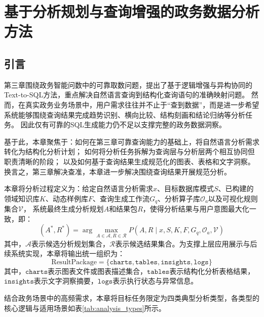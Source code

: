 \chapter{基于分析规划与查询增强的政务数据分析方法}\label{chap:analysis_method}

\section{引言}

第三章围绕政务智能问数中的可靠取数问题，提出了基于逻辑增强与异构协同的Text-to-SQL方法，重点解决自然语言查询到结构化查询语句的准确映射问题。
然而，在真实政务业务场景中，用户需求往往并不止于“查到数据”，而是进一步希望系统能够围绕查询结果完成趋势识别、横向比较、结构刻画和结论归纳等分析任务。
因此仅有可靠的SQL生成能力仍不足以支撑完整的政务数据洞察。

基于此，本章聚焦于：如何在第三章可靠查询能力的基础上，将自然语言分析需求转化为结构化分析计划；
如何将分析任务拆解为查询层与分析层两个相互协同但职责清晰的阶段；
以及如何基于查询结果生成规范化的图表、表格和文字洞察。换言之，第三章解决查准，本章进一步解决围绕查询结果开展规范分析。

本章将分析过程定义为：给定自然语言分析需求$x$、目标数据库模式$S$、已构建的领域知识库$K$、动态样例库$F$、查询生成工作流$G_q$、分析算子库$\mathcal{O}_a$以及可视化规则集合$\mathcal{V}$，
系统最终生成分析规划$A$和结果包$R$，使得分析结果与用户意图最大化一致，即：
\begin{equation}
(A^*, R^*) = \arg\max_{A \in \mathcal{A}, R \in \mathcal{R}} P(A, R \mid x, S, K, F, G_q, \mathcal{O}_a, \mathcal{V})
\label{eq:analysis_task_def}
\end{equation}
其中，$\mathcal{A}$表示候选分析规划集合，$\mathcal{R}$表示候选结果集合。为支撑上层应用展示与后续系统实现，本章将输出统一组织为：
\begin{equation}
\text{ResultPackage} = \{\texttt{charts}, \texttt{tables}, \texttt{insights}, \texttt{logs}\}
\label{eq:result_package}
\end{equation}
其中，$\texttt{charts}$表示图表文件或图表描述集合，$\texttt{tables}$表示结构化分析表格结果，$\texttt{insights}$表示文字洞察摘要，$\texttt{logs}$表示执行状态与异常信息。

结合政务场景中的高频需求，本章将目标任务限定为四类典型分析类型，各类型的核心逻辑与适用场景如表\ref{tab:analysis_types}所示。

